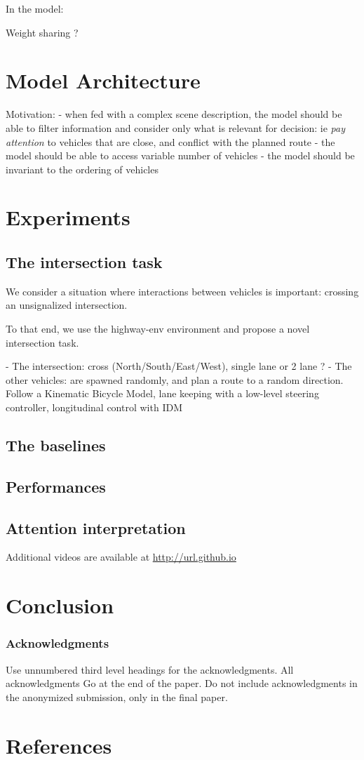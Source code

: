 \documentclass{article}
\begin{document}
In the model:

Weight sharing ?

\section{Model Architecture}

Motivation: 
- when fed with a complex scene description, the model should be able to filter information and consider only what is relevant for decision: ie \emph{pay attention} to vehicles that are close, and conflict with the planned route
- the model should be able to access variable number of vehicles
- the model should be invariant to the ordering of vehicles


\section{Experiments}
\subsection{The intersection task}

We consider a situation where interactions between vehicles is important: crossing an unsignalized intersection.

To that end, we use the highway-env environment and propose a novel intersection task.

- The intersection: cross (North/South/East/West), single lane or 2 lane ?
- The other vehicles: are spawned randomly, and plan a route to a random direction.
Follow a Kinematic Bicycle Model, lane keeping with a low-level steering controller, longitudinal control with IDM


\subsection{The baselines}
\subsection{Performances}
\subsection{Attention interpretation}

Additional videos are available at \url{http://url.github.io}

\section{Conclusion}

\subsubsection*{Acknowledgments}

Use unnumbered third level headings for the acknowledgments. All acknowledgments
Go at the end of the paper. Do not include acknowledgments in the anonymized
submission, only in the final paper.

\section*{References}
\end{document}
